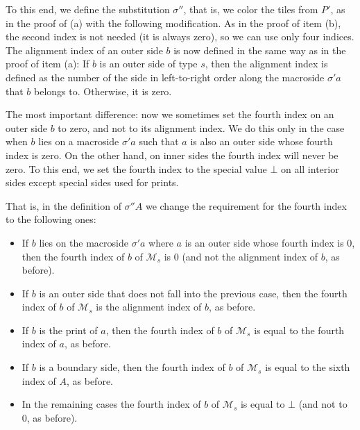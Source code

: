 \documentclass[12pt]{article}
\theoremstyle{remark}
\newcommand{\undef}{\bot}
\begin{document}
To this end, we define the substitution $\sigma''$, that is, we color the tiles from $P'$, as in the proof of (a)
with the following modification.
As in the proof of item (b), the second index is not needed (it is always zero), so we can use only four
indices.
The alignment index of an outer side $b$ is now defined in the same way as in the proof of item (a):
If $b$ is an outer side of type $s$,
then the alignment index is defined as the number of the side in left-to-right order
along the macroside $\sigma' a$ that $b$ belongs to.
Otherwise, it is zero. 

The most important difference: now we sometimes set the fourth index on an outer side $b$ to zero,
and not to its alignment index.
We do this only in the case when $b$ lies on a macroside $\sigma' a$ such that $a$ is also an outer 
side whose fourth index is zero. 
On the other hand, on inner sides the fourth index will never be zero. To this end, we set
the fourth index  to the special value $\undef$
on all interior sides except special sides used for 
prints.

That is, in the definition of $\sigma'' A$ 
we change the requirement for the fourth index to the following ones:
\begin{itemize}
\item If $b$ lies on the macroside $\sigma' a$ where $a$  is an outer side
whose  fourth index is 0, then 
the fourth index of $b$ of $\mathcal M_s$
is $0$ (and not the alignment index of $b$, as before).
\item If $b$ is an outer side that does not fall into the previous case,
then the fourth index of $b$ of $\mathcal M_s$
is the alignment index of $b$, as before.
\item If $b$ is the print of $a$, then 
the fourth index of $b$ of $\mathcal M_s$ is equal to the fourth index of $a$, as before.
\item If $b$ is a boundary side, then  
the fourth index of $b$ of $\mathcal M_s$ is equal to the sixth index of  $A$, as before.
\item In the remaining cases the fourth index of $b$ of $\mathcal M_s$ is equal to $\undef$
(and not to 0, as before).
\end{itemize}
\end{document}
